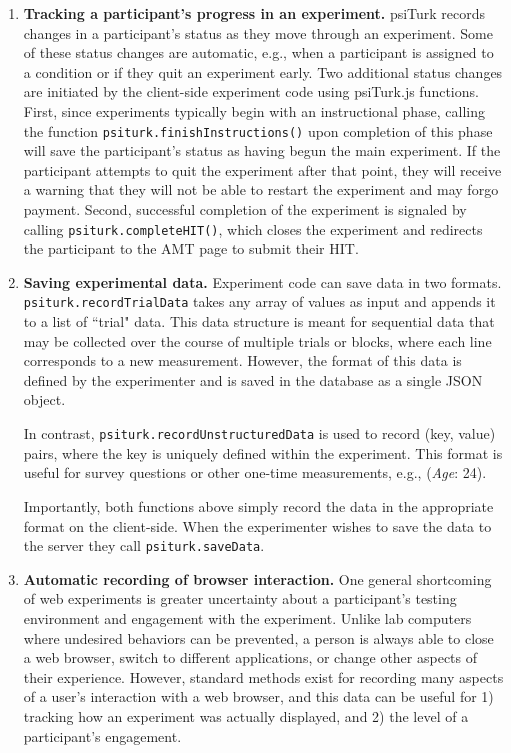\documentclass[jou,apacite]{apa6}
\begin{document}
\begin{enumerate}

\item \textbf{Tracking a participant's progress in an experiment.} psiTurk records changes in a participant's status as they move through an experiment. 
Some of these status changes are automatic, e.g., when a participant is assigned to a condition or if they quit an experiment early. 
Two additional status changes are initiated by the client-side experiment code using psiTurk.js functions.
First, since experiments typically begin with an instructional phase, calling the function \texttt{psiturk.finishInstructions()} upon completion of this phase will save the participant's status as having begun the main experiment.
If the participant attempts to quit the experiment after that point, they will receive a warning that they will not be able to restart the experiment and may forgo payment.
Second, successful completion of the experiment is signaled by calling \texttt{psiturk.completeHIT()}, which closes the experiment and redirects the participant to the AMT page to submit their HIT.

\item \textbf{Saving experimental data.} Experiment code can save data in two formats.
\texttt{psiturk.recordTrialData} takes any array of values as input and appends it to a list of ``trial" data.
This data structure is meant for sequential data that may be collected over the course of multiple trials or blocks, where each line corresponds to a new measurement.
However, the format of this data is defined by the experimenter and is saved in the database as a single JSON object.

In contrast, \texttt{psiturk.recordUnstructuredData} is used to record (key, value) pairs, where the key is uniquely defined within the experiment.
This format is useful for survey questions or other one-time measurements, e.g., (\emph{Age}: 24).

Importantly, both functions above simply record the data in the appropriate format on the client-side.
When the experimenter wishes to save the data to the server they call \texttt{psiturk.saveData}.

\item \textbf{Automatic recording of browser interaction.} 
One general shortcoming of web experiments is greater uncertainty about a participant's testing environment and engagement with the experiment.
Unlike lab computers where undesired behaviors can be prevented, a person is always able to close a web browser, switch to different applications, or change other aspects of their experience.
However, standard methods exist for recording many aspects of a user's interaction with a web browser, and this data can be useful for 1) tracking how an experiment was actually displayed, and 2) the level of a participant's engagement.


\end{enumerate}
\end{document}
